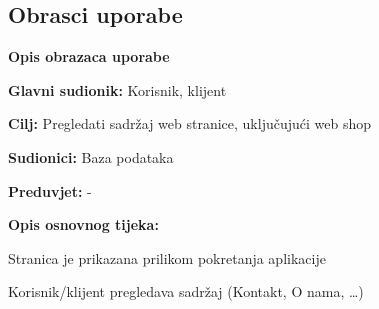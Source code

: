 			\eject 
			
			
				
			\subsection{Obrasci uporabe}
				
				\vspace{20px}
				\textbf{Opis obrazaca uporabe}

				
				\noindent {}
				\begin{packed_item}
					
					\item \textbf{Glavni sudionik: } Korisnik, klijent
					\item  \textbf{Cilj:} Pregledati sadržaj web stranice, uključujući web shop
					\item  \textbf{Sudionici:} Baza podataka
					\item  \textbf{Preduvjet:}  - 
					\item  \textbf{Opis osnovnog tijeka:}
					
					\item[] \begin{packed_enum}
						\item Stranica je prikazana prilikom pokretanja aplikacije
						\item Korisnik/klijent pregledava sadržaj (Kontakt, O nama, …) 
					\end{packed_enum}
				\end{packed_item}
				
				\vspace{10px}
				
